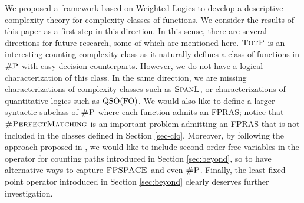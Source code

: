 
We proposed a framework based on Weighted Logics to develop a descriptive complexity theory for complexity classes of functions.
We consider the results of this paper as a first step in this direction.
In this sense, there are several directions for future research, some of which are mentioned here. 
$\text{\sc TotP}$ is an interesting counting complexity class as it naturally defines a class of functions in $\text{\sc \#P}$ with easy decision counterparts. However, we do not have a logical characterization of this class.
In the same direction, we are missing characterizations of complexity classes such as $\text{\sc SpanL}$, or characterizations of quantitative logics such as ${\rm QSO}({\rm FO})$.
We would also like to define a larger syntactic subclass of $\text{\sc \#P}$ where each function admits an FPRAS; notice that $\textsc{\#PerfectMatching}$ is an important problem admitting an FPRAS\cite{JSV04} that is not included in the classes defined in Section \ref{sec-clo}. Moreover, by following the approach proposed in
\cite{I83}, we would like to include second-order free variables in the operator for counting paths introduced in Section \ref{sec:beyond}, so to have alternative ways to capture $\text{\sc FPSPACE}$ and even $\text{\sc \#P}$. Finally, the least fixed point operator introduced in Section \ref{sec:beyond} clearly deserves further investigation.


